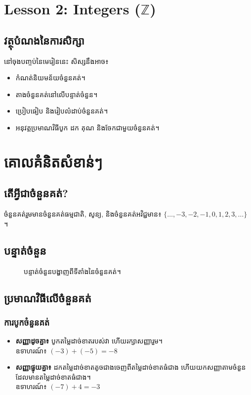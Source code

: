 \clearpage
\setcounter{section}{0}

\section*{Lesson 2: Integers ($\mathbb{Z}$)}


\subsection*{វត្ថុបំណងនៃការសិក្សា}
នៅចុងបញ្ចប់នៃមេរៀននេះ សិស្សនឹងអាច៖
\begin{itemize}[label=-]
    \item កំណត់និយមន័យចំនួនគត់។
    \item តាងចំនួនគត់នៅលើបន្ទាត់ចំនួន។
    \item ប្រៀបធៀប និងរៀបលំដាប់ចំនួនគត់។
    \item អនុវត្តប្រមាណវិធីបូក ដក គុណ និងចែកជាមួយចំនួនគត់។
\end{itemize}

\section{គោលគំនិតសំខាន់ៗ}
\subsection{តើអ្វីជាចំនួនគត់?}
ចំនួនគត់រួមមានចំនួនគត់ធម្មជាតិ, សូន្យ, និងចំនួនគត់អវិជ្ជមាន៖ $\{\dots, -3, -2, -1, 0, 1, 2, 3, \dots\}$ ។

\subsection{បន្ទាត់ចំនួន}
\begin{figure}[h!]
    \centering
    \caption{បន្ទាត់ចំនួនបង្ហាញពីទីតាំងនៃចំនួនគត់។}
    \label{fig:integer-number-line}
\end{figure}

\subsection{ប្រមាណវិធីលើចំនួនគត់}
\subsubsection{ការបូកចំនួនគត់}
\begin{itemize}[label=-]
    \item \textbf{សញ្ញាដូចគ្នា៖} បូកតម្លៃដាច់ខាតរបស់វា ហើយរក្សាសញ្ញារួម។\\
    ឧទាហរណ៍៖ $(-3) + (-5) = -8$
    \item \textbf{សញ្ញាផ្ទុយគ្នា៖} ដកតម្លៃដាច់ខាតតូចជាងចេញពីតម្លៃដាច់ខាតធំជាង ហើយយកសញ្ញាតាមចំនួនដែលមានតម្លៃដាច់ខាតធំជាង។\\
    ឧទាហរណ៍៖ $(-7) + 4 = -3$
\end{itemize}

